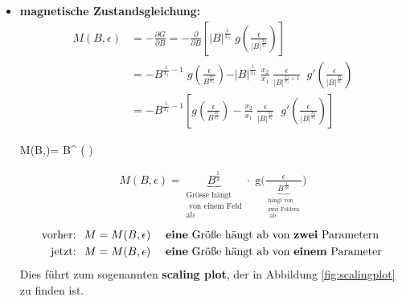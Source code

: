 \documentclass[12pt]{article}
\begin{document}
\begin{itemize}
\item \textbf{magnetische Zustandsgleichung:}
\begin{align}
M(B,\epsilon)& = - \frac{\partial G}{\partial B} = - \frac{\partial}{\partial B} \left[ \vert B \vert ^\frac{1}{x_1} \; g\left( \frac{\epsilon}{\vert B \vert ^\frac{x_2}{x_1}} \right) \right] \\
&= - B^{\frac{1}{x_1}-1} \; g\left( \frac{\epsilon}{B^\frac{x_2}{x_1}}\right) - \vert B \vert ^\frac{1}{x_1} \; \frac{x_2}{x_1} \; \frac{\epsilon}{\vert B \vert ^{\frac{x_2}{x_1}+1} }  \; \; g'\left( \frac{\epsilon}{\vert B \vert ^\frac{x_2}{x_1} }\right) \\
&= - B^{\frac{1}{x_1}-1} \left[ 
g\left( \frac{\epsilon}{B^\frac{x_2}{x_1}}\right) 
- \frac{x_2}{x_1} \; \frac{\epsilon}{\vert B \vert ^{\frac{x_2}{x_1}} } \; \;g'\left( \frac{\epsilon}{\vert B \vert ^\frac{x_2}{x_1} }\right) \right] 
\end{align}
\begin{tcolorbox}[ams gather,title=, colback=blue!10!white, colframe=blue!30!black] 
M(B,\epsilon)= B^ \; \;  \left(  \right)   \label{Magnetisierung}
\end{tcolorbox}
\begin{align}
M(B,\epsilon)
= \underbrace{B^\frac{1}{\delta}}_{ \substack{ \text{Grösse hängt} \\ \text{ von einem Feld} \\ \text{ab}}} \cdot \; \text{\~{g}} \Big( \frac{\epsilon}{\underbrace{ B^\frac{1}{\beta \delta}}_{ \substack{ \text{hängt von} \\ \text{zwei Feldern} \\ \text{ ab}}}} \Big) 
\end{align} 
\begin{align*}
\mbox{vorher: } \; & M = M(B,\epsilon) \quad \text{ \textbf{eine} Größe hängt ab von \textbf{zwei} Parametern }\\
\mbox{jetzt: }\; & M = M(B,\epsilon) \quad \text{ \textbf{eine} Größe hängt ab von \textbf{einem} Parameter}
\end{align*}
Dies führt zum sogenannten \textbf{scaling plot}, der in Abbildung \ref{fig:scalingplot} zu finden ist. \\


\end{itemize}
\end{document}

